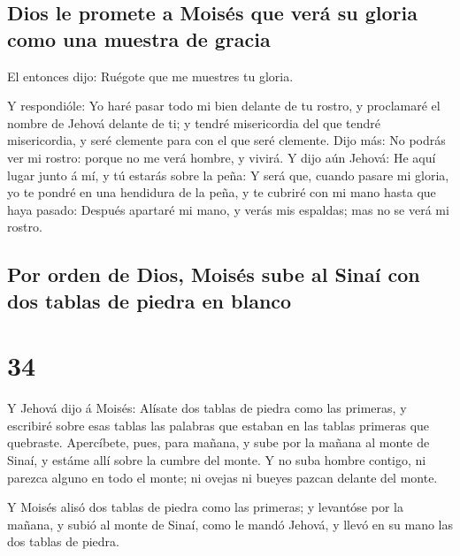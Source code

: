 \hypertarget{dios-le-promete-a-moisuxe9s-que-veruxe1-su-gloria-como-una-muestra-de-gracia}{%
\subsection{Dios le promete a Moisés que verá su gloria como una muestra
de
gracia}\label{dios-le-promete-a-moisuxe9s-que-veruxe1-su-gloria-como-una-muestra-de-gracia}}

 El entonces dijo: Ruégote que me muestres tu gloria.

 Y respondióle: Yo haré pasar todo mi bien delante de tu
rostro, y proclamaré el nombre de Jehová delante de ti; y tendré
misericordia del que tendré misericordia, y seré clemente para con el
que seré clemente.  Dijo más: No podrás ver mi rostro:
porque no me verá hombre, y vivirá.  Y dijo aún Jehová:
He aquí lugar junto á mí, y tú estarás sobre la peña:  Y
será que, cuando pasare mi gloria, yo te pondré en una hendidura de la
peña, y te cubriré con mi mano hasta que haya pasado: 
Después apartaré mi mano, y verás mis espaldas; mas no se verá mi
rostro.

\hypertarget{por-orden-de-dios-moisuxe9s-sube-al-sinauxed-con-dos-tablas-de-piedra-en-blanco}{%
\subsection{Por orden de Dios, Moisés sube al Sinaí con dos tablas de
piedra en
blanco}\label{por-orden-de-dios-moisuxe9s-sube-al-sinauxed-con-dos-tablas-de-piedra-en-blanco}}

\hypertarget{section-33}{%
\section{34}\label{section-33}}

 Y Jehová dijo á Moisés: Alísate dos tablas de piedra como
las primeras, y escribiré sobre esas tablas las palabras que estaban en
las tablas primeras que quebraste.  Apercíbete, pues, para
mañana, y sube por la mañana al monte de Sinaí, y estáme allí sobre la
cumbre del monte.  Y no suba hombre contigo, ni parezca
alguno en todo el monte; ni ovejas ni bueyes pazcan delante del monte.

 Y Moisés alisó dos tablas de piedra como las primeras; y
levantóse por la mañana, y subió al monte de Sinaí, como le mandó
Jehová, y llevó en su mano las dos tablas de piedra.

